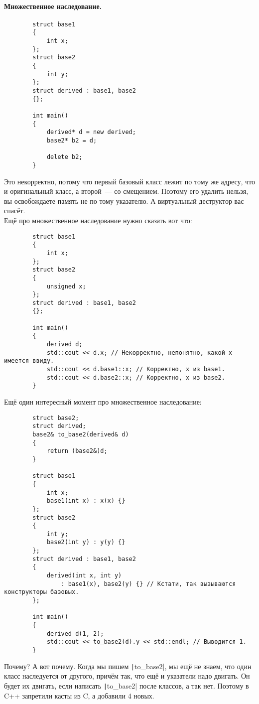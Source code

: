 \documentclass{article}
\begin{document}
    \paragraph{Множественное наследование.}
    \begin{verbatim}
        struct base1
        {
            int x;
        };
        struct base2
        {
            int y;
        };
        struct derived : base1, base2
        {};
        
        int main()
        {
            derived* d = new derived;
            base2* b2 = d;

            delete b2;
        }
    \end{verbatim}
    Это некорректно, потому что первый базовый класс лежит по тому же адресу, что и оригинальный класс, а второй~--- со смещением. Поэтому его удалить нельзя, вы освобождаете память не по тому указателю. А виртуальный деструктор вас спасёт.\\
    Ещё про множественное наследование нужно сказать вот что:
    \begin{verbatim}
        struct base1
        {
            int x;
        };
        struct base2
        {
            unsigned x;
        };
        struct derived : base1, base2
        {};
        
        int main()
        {
            derived d;
            std::cout << d.x; // Некорректно, непонятно, какой x имеется ввиду.
            std::cout << d.base1::x; // Корректно, x из base1.
            std::cout << d.base2::x; // Корректно, x из base2.
        }
    \end{verbatim}
    Ещё один интересный момент про множественное наследование:
    \begin{verbatim}
        struct base2;
        struct derived;
        base2& to_base2(derived& d)
        {
            return (base2&)d;
        }

        struct base1
        {
            int x;
            base1(int x) : x(x) {}
        };
        struct base2
        {
            int y;
            base2(int y) : y(y) {}
        };
        struct derived : base1, base2
        {
            derived(int x, int y)
                : base1(x), base2(y) {} // Кстати, так вызываются конструкторы базовых.
        };

        int main()
        {
            derived d(1, 2);
            std::cout << to_base2(d).y << std::endl; // Выводится 1.
        }
    \end{verbatim}
    Почему? А вот почему. Когда мы пишем \texttt|to_base2|, мы ещё не знаем, что один класс наследуется от другого, причём так, что ещё и указатели надо двигать. Он будет их двигать, если написать \texttt|to_base2| после классов, а так нет. Поэтому в C++ запретили касты из C, а добавили 4 новых.
\end{document}
